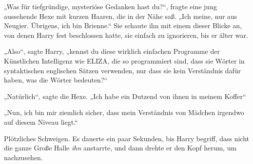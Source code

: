 „Was für tiefgründige, mysteriöse Gedanken hast du?“, fragte eine jung aussehende Hexe mit kurzen Haaren, die in der Nähe saß.
„Ich meine, nur aus Neugier. Übrigens, ich bin Brienne.“
Sie schaute ihn mit einem dieser Blicke an, von denen Harry fest beschlossen hatte, sie einfach zu ignorieren, bis er älter war.

„Also“, sagte Harry, „kennst du diese wirklich einfachen Programme der Künstlichen Intelligenz wie ELIZA, die so programmiert sind, dass sie Wörter in syntaktischen englischen Sätzen verwenden, nur dass sie kein Verständnis dafür haben, was die Wörter bedeuten?“

„Natürlich“, sagte die Hexe.
„Ich habe ein Dutzend von ihnen in meinem Koffer“

„Nun, ich bin mir ziemlich sicher, dass mein Verständnis von Mädchen irgendwo auf diesem Niveau liegt.“



Plötzliches Schweigen. Es dauerte ein paar Sekunden, bis Harry begriff, dass nicht die ganze Große Halle \emph{ihn} anstarrte, und dann drehte er den Kopf herum, um nachzusehen.

